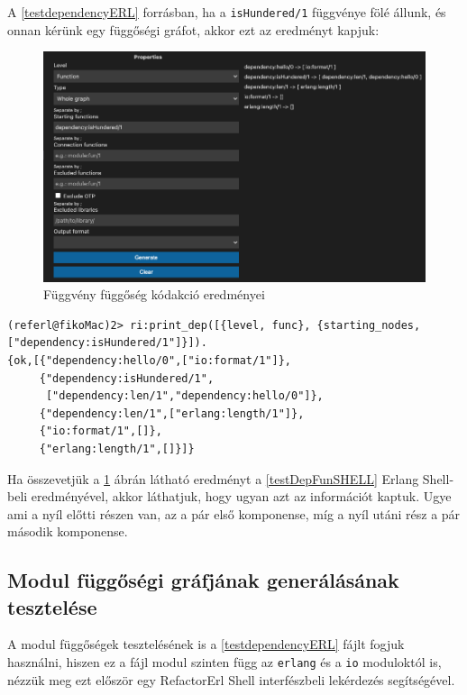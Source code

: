 A \ref{testdependencyERL} forrásban, ha a \lstinline{isHundered/1} függvénye fölé állunk, és onnan kérünk egy függőségi gráfot, akkor ezt az eredményt kapjuk:

\begin{figure}[H]
  \centering
  \includegraphics[width=\linewidth]{images/testCases/funDep.png}
  \caption{Függvény függőség kódakció eredményei}
  \label{fig:funDep}
\end{figure}


\lstset{caption=Függvány függőség lekérdezésének eredménye, label=src:shell} \label{testDepFunSHELL}
\begin{lstlisting}[language={shell}]  
(referl@fikoMac)2> ri:print_dep([{level, func}, {starting_nodes, ["dependency:isHundered/1"]}]).
{ok,[{"dependency:hello/0",["io:format/1"]},
     {"dependency:isHundered/1",
      ["dependency:len/1","dependency:hello/0"]},
     {"dependency:len/1",["erlang:length/1"]},
     {"io:format/1",[]},
     {"erlang:length/1",[]}]}
\end{lstlisting}


Ha összevetjük a \ref{fig:funDep} ábrán látható eredményt a \ref{testDepFunSHELL} Erlang Shell-beli eredményével, akkor láthatjuk, hogy ugyan azt az információt kaptuk. Ugye ami a nyíl előtti részen van, az a pár első komponense, míg a nyíl utáni rész a pár második komponense.


\subsection{Modul függőségi gráfjának generálásának tesztelése}

A modul függőségek tesztelésének is a \ref{testdependencyERL} fájlt fogjuk használni, hiszen ez a fájl modul szinten függ az \lstinline{erlang} és a \lstinline{io} moduloktól is, nézzük meg ezt először egy RefactorErl Shell interfészbeli lekérdezés segítségével.

